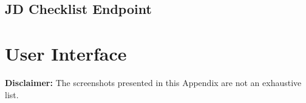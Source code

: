\begin{appendices}
\section{JD Checklist Endpoint} \label{app:Endpoint}

\chapter{User Interface}
\vspace{-5pt}
{\footnotesize \textbf{Disclaimer:} The screenshots presented in this Appendix are not an exhaustive list.}
\vspace{-15pt}

\end{appendices}
